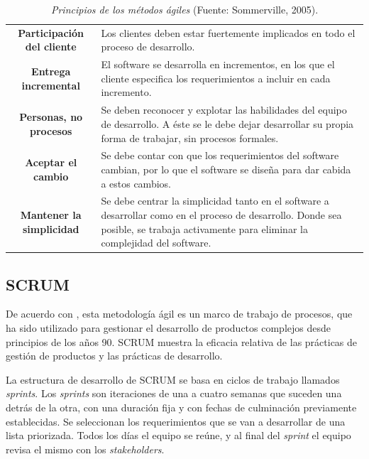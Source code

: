 	\begin{table}[t]
		\small
		\caption[Principios de los m\'{e}todos \'{a}giles]{\textit{Principios de los m\'{e}todos \'{a}giles} (Fuente: Sommerville, 2005).}
		\centering
		\setlength{\extrarowheight}{\altocelda}
		\begin{tabulary}{\anchotabla}{|c|J|}
			\hline
			 & \\ \hline
			\textbf{Participaci\'{o}n del cliente} & Los clientes deben estar fuertemente implicados en todo el proceso de desarrollo.\\ \hline
			\textbf{Entrega incremental} & El software se desarrolla en incrementos, en los que el cliente especifica los requerimientos a incluir en cada incremento.\\ \hline
			\textbf{Personas, no procesos} & Se deben reconocer y explotar las habilidades del equipo de desarrollo. A \'{e}ste se le debe dejar desarrollar su propia forma de trabajar, sin procesos formales.\\ \hline
			\textbf{Aceptar el cambio} & Se debe contar con que los requerimientos del software cambian, por lo que el software se dise\~{n}a para dar cabida a estos cambios.\\ \hline
			\textbf{Mantener la simplicidad} & Se debe centrar la simplicidad tanto en el software a desarrollar como en el proceso de desarrollo. Donde sea posible, se trabaja activamente para eliminar la complejidad del software.\\ \hline
		\end{tabulary}
	\end{table}

		\subsection{SCRUM}
De acuerdo con , esta metodolog\'{i}a \'{a}gil es un marco de trabajo de procesos, que ha sido utilizado para gestionar el desarrollo de productos complejos desde principios de los a\~{n}os 90. SCRUM muestra la eficacia relativa de las pr\'{a}cticas de gesti\'{o}n de productos y las pr\'{a}cticas de desarrollo.

La estructura de desarrollo de SCRUM se basa en ciclos de trabajo llamados \textit{sprints}. Los \textit{sprints} son iteraciones de una a cuatro semanas que suceden una detr\'{a}s de la otra, con una duraci\'{o}n fija y con fechas de culminaci\'{o}n previamente establecidas. Se seleccionan los requerimientos que se van a desarrollar de una lista priorizada. Todos los d\'{i}as el equipo se re\'{u}ne, y al final del \textit{sprint} el equipo revisa el mismo con los \textit{stakeholders}.

